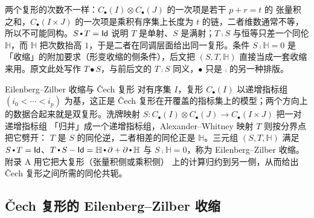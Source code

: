 \begin{yizhu}
两个复形的次数不一样：$C_{\bullet}(I)\otimes C_{\bullet}(J)$ 的一次项是若干 $p+r=t$ 的
张量积之和，$C_{\bullet}(I\times J)$ 的一次项是乘积有序集上长度为 $t$ 的链，二者维数通常不等，
所以不可能同构。$S\comp T=\id$ 说明 $T$ 是单射、$S$ 是满射；$T\comp S$ 与恒等只差一个同伦
$\mathbb{H}$，而 $\mathbb{H}$ 把次数抬高 $1$，于是二者在同调层面给出同一复形。条件
$S\comp\mathbb{H}=0$ 是「收缩」的附加要求（形变收缩的侧条件），后文把
$(S,T,\mathbb{H})$ 直接当成一套收缩来用。原文此处写作 $T\bullet S$，与前后文的 $T\comp S$
同义，$\bullet$ 只是 $\comp$ 的另一种排版。
\end{yizhu}

\begin{conceptbox}{Eilenberg–Zilber 收缩与 Čech 复形}
对有序集 $I$，复形 $C_{\bullet}(I)$ 以递增指标组 $(i_0<\cdots<i_p)$ 为基，这正是
Čech 复形在开覆盖的指标集上的模型；两个方向上的数据合起来就是双复形。洗牌映射
$S\colon C_{\bullet}(I)\otimes C_{\bullet}(J)\to C_{\bullet}(I\times J)$ 把一对递增指标组
「归并」成一个递增指标组，Alexander--Whitney 映射 $T$ 则按分界点把它劈开：
$T$ 是 $S$ 的同伦逆，二者相差的同伦正是 $\mathbb{H}$。三元组 $(S,T,\mathbb{H})$ 满足
$S\comp T=\id$、$T\comp S-\id=\mathbb{H}\comp\partial+\partial\comp\mathbb{H}$ 与
$S\comp\mathbb{H}=0$，称为 Eilenberg--Zilber 收缩。附录 A 用它把大复形（张量积侧或乘积侧）
上的计算归约到另一侧，从而给出 Čech 复形之间所需的同伦共轭。
\par\smallskip{}
\end{conceptbox}

\subsection{\v{C}ech 复形的 Eilenberg--Zilber 收缩}\label{subsec:Eilenberg-Zilber-contraction-Cech}

